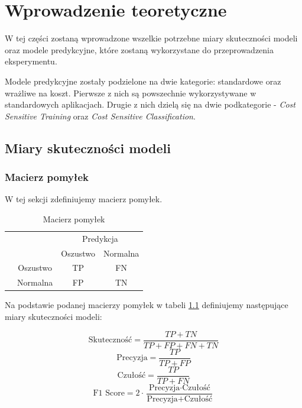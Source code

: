 \documentclass{book}
\begin{document}
\chapter{Wprowadzenie teoretyczne}

W tej części zostaną wprowadzone wszelkie potrzebne miary skuteczności modeli oraz modele predykcyjne, które zostaną wykorzystane do przeprowadzenia eksperymentu. 

Modele predykcyjne zostały podzielone na dwie kategorie: standardowe oraz wrażliwe na koszt. Pierwsze z nich są powszechnie wykorzystywane w standardowych aplikacjach. Drugie z nich dzielą się na dwie podkategorie - \textit{Cost Sensitive Training} oraz \textit{Cost Sensitive Classification}.

\section{Miary skuteczności modeli}

\subsection{Macierz pomyłek}

W tej sekcji zdefiniujemy macierz pomyłek.
\begin{table}[h]
	\begin{center}
		\makegapedcells
		\begin{tabular}{cc|cc}
			\multicolumn{2}{c}{}     &   \multicolumn{2}{c}{Predykcja} \\
			&            &   Oszustwo &   Normalna     \\ 
			\cline{2-4}
			\multirow{2}{*}{\rotatebox[origin=c]{90}{Prawda}} & Oszustwo   & TP         & FN              \\
			& Normalna   & FP         & TN              \\ 
			\cline{2-4}
		\end{tabular}
	\end{center}
	\caption{Macierz pomyłek}
	\label{macierz-pomylek}
\end{table}


Na podstawie podanej macierzy pomyłek w tabeli \ref{macierz-pomylek} definiujemy następujące miary skuteczności modeli:

$$ \text{Skuteczność} = \frac{TP + TN}{TP + FP + FN + TN} $$
$$ \text{Precyzja} = \frac{TP}{TP + FP} $$
$$ \text{Czułość}= \frac{TP}{TP + FN} $$
$$ \text{F1 Score} = 2 \cdot \frac{\text{Precyzja} \cdot \text{Czułość}}{\text{Precyzja} + \text{Czułość}} $$
\end{document}
